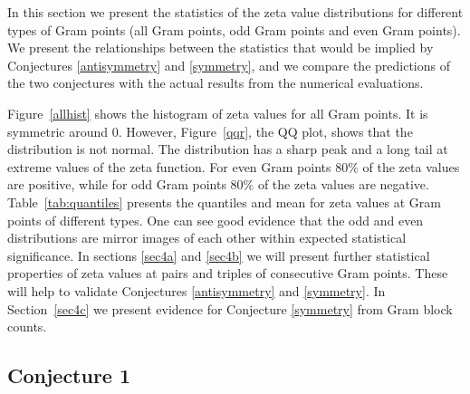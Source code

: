 \documentclass[twoside]{article}
\begin{document}
In this section we present the statistics of the zeta value distributions for different types of Gram points (all Gram points, odd Gram points and even Gram points). We present the relationships between the statistics that would be implied by Conjectures \ref{antisymmetry} and \ref{symmetry}, and we compare the predictions of the two conjectures with the actual results from the numerical evaluations. 

Figure~\ref{allhist} shows the histogram of zeta values for all Gram points. It  is symmetric around $0$. However, Figure~\ref{qqr}, the QQ plot, shows that the distribution is not normal. The distribution has a sharp peak and a long tail at extreme values of the zeta function. For even Gram points $80\%$ of the zeta values are positive, while for odd Gram points $80\%$ of the zeta values are negative. Table~\ref{tab:quantiles} presents the quantiles and mean for zeta values at Gram points of different types.  One can see good evidence that the odd and even distributions are mirror images of each other within expected statistical significance. In sections 
\ref{sec4a} and \ref{sec4b} we will present further statistical properties of zeta values at pairs and triples of consecutive Gram points. These will help to validate Conjectures  \ref{antisymmetry} and  \ref{symmetry}. In Section~\ref{sec4c} we present evidence for  Conjecture  \ref{symmetry} from Gram block counts.

\subsection{\label{sec4a}Conjecture 1}
\end{document}

